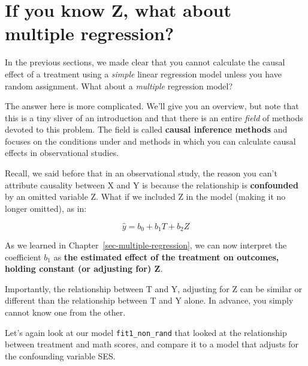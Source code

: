 \documentclass[
  letterpaper,
  DIV=11,
  numbers=noendperiod]{scrreprt}
\newenvironment{Shaded}{\begin{snugshade}}{\end{snugshade}}
\newcommand{\AttributeTok}[1]{\textcolor[rgb]{0.40,0.45,0.13}{#1}}
\newcommand{\FunctionTok}[1]{\textcolor[rgb]{0.28,0.35,0.67}{#1}}
\newcommand{\NormalTok}[1]{\textcolor[rgb]{0.00,0.23,0.31}{#1}}
\newcommand{\OtherTok}[1]{\textcolor[rgb]{0.00,0.23,0.31}{#1}}
\newcommand{\SpecialCharTok}[1]{\textcolor[rgb]{0.37,0.37,0.37}{#1}}
\theoremstyle{definition}
\theoremstyle{remark}
\begin{document}
\hypertarget{if-you-know-z-what-about-multiple-regression}{%
\section{If you know Z, what about multiple
regression?}\label{if-you-know-z-what-about-multiple-regression}}

In the previous sections, we made clear that you cannot calculate the
causal effect of a treatment using a \emph{simple} linear regression
model unless you have random assignment. What about a \emph{multiple}
regression model?

The answer here is more complicated. We'll give you an overview, but
note that this is a tiny sliver of an introduction and that there is an
entire \emph{field} of methods devoted to this problem. The field is
called \textbf{causal inference methods} and focuses on the conditions
under and methods in which you can calculate causal effects in
observational studies.

Recall, we said before that in an observational study, the reason you
can't attribute causality between X and Y is because the relationship is
\textbf{confounded} by an omitted variable Z. What if we included Z in
the model (making it no longer omitted), as in:

\[\hat{y} = b_0 + b_1T + b_2Z\]

As we learned in Chapter~\ref{sec-multiple-regression}, we can now
interpret the coefficient \(b_1\) as \textbf{the estimated effect of the
treatment on outcomes, holding constant (or adjusting for) Z}.

Importantly, the relationship between T and Y, adjusting for Z can be
similar or different than the relationship between T and Y alone. In
advance, you simply cannot know one from the other.

Let's again look at our model \texttt{fit1\_non\_rand} that looked at
the relationship between treatment and math scores, and compare it to a
model that adjusts for the confounding variable SES.

\begin{Shaded}
\end{Shaded}
\end{document}
